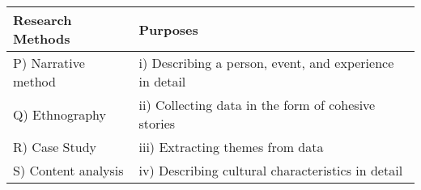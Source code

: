     \begin{tabular}{|l|p{6cm}|}
        \hline
        \textbf{Research Methods} & \textbf{Purposes} \\
        \hline
        P) Narrative method & i) Describing a person, event, and experience in detail \\
        Q) Ethnography & ii) Collecting data in the form of cohesive stories \\
        R) Case Study & iii) Extracting themes from data \\
        S) Content analysis & iv) Describing cultural characteristics in detail \\
        \hline
    \end{tabular}

